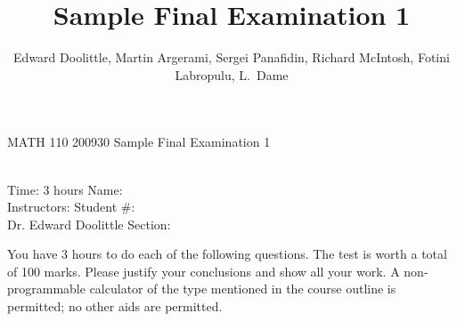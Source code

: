 \documentclass[12pt]{article}
\title{Sample Final Examination 1}
\author{Edward Doolittle, Martin Argerami, Sergei Panafidin, Richard McIntosh, Fotini Labropulu, L.\ Dame}
\begin{document}
\thispagestyle{plain}

\begin{center}
  \LARGE{MATH 110 200930 Sample Final Examination 1}
\end{center}

\begin{flushleft}
\quad\\
Time:  3 hours                  \hfill       Name: \underline{\hspace{2in}}  \\
Instructors:                    \hfill Student \#: \underline{\hspace{2in}}  \\
\quad Dr. Edward Doolittle      \hfill    Section: \underline{\hspace{2in}}  \\
\end{flushleft}


\noindent
You have 3 hours to do each of the following questions.
The test is worth a total of 100 marks.
Please justify your conclusions and
show all your work.
A non-programmable calculator of the type mentioned in the course outline
is permitted; no other aids are permitted.
\end{document}
